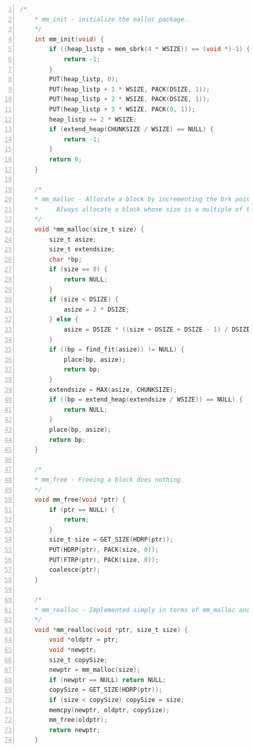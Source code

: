 \documentclass{article}
\begin{document}
\begin{lstlisting}[xleftmargin = 4em,xrightmargin = 3em, aboveskip = 1em, numbers = left, language = C]
    /* 
    * mm_init - initialize the malloc package.
    */
    int mm_init(void) {
        if ((heap_listp = mem_sbrk(4 * WSIZE)) == (void *)-1) {
            return -1;
        }
        PUT(heap_listp, 0);
        PUT(heap_listp + 1 * WSIZE, PACK(DSIZE, 1));
        PUT(heap_listp + 2 * WSIZE, PACK(DSIZE, 1));
        PUT(heap_listp + 3 * WSIZE, PACK(0, 1));
        heap_listp += 2 * WSIZE;
        if (extend_heap(CHUNKSIZE / WSIZE) == NULL) {
            return -1;
        }
        return 0;
    }

    /* 
    * mm_malloc - Allocate a block by incrementing the brk pointer.
    *     Always allocate a block whose size is a multiple of the alignment.
    */
    void *mm_malloc(size_t size) {
        size_t asize;
        size_t extendsize;
        char *bp;
        if (size == 0) {
            return NULL;
        }
        if (size < DSIZE) {
            asize = 2 * DSIZE;
        } else {
            asize = DSIZE * ((size + DSIZE + DSIZE - 1) / DSIZE);
        }
        if ((bp = find_fit(asize)) != NULL) {
            place(bp, asize);
            return bp;
        }
        extendsize = MAX(asize, CHUNKSIZE);
        if ((bp = extend_heap(extendsize / WSIZE)) == NULL) {
            return NULL;
        }
        place(bp, asize);
        return bp;
    }

    /*
    * mm_free - Freeing a block does nothing.
    */
    void mm_free(void *ptr) {
        if (ptr == NULL) {
            return;
        }
        size_t size = GET_SIZE(HDRP(ptr));
        PUT(HDRP(ptr), PACK(size, 0));
        PUT(FTRP(ptr), PACK(size, 0));
        coalesce(ptr);
    }

    /*
    * mm_realloc - Implemented simply in terms of mm_malloc and mm_free
    */
    void *mm_realloc(void *ptr, size_t size) {
        void *oldptr = ptr;
        void *newptr;
        size_t copySize;
        newptr = mm_malloc(size);
        if (newptr == NULL) return NULL;
        copySize = GET_SIZE(HDRP(ptr));
        if (size < copySize) copySize = size;
        memcpy(newptr, oldptr, copySize);
        mm_free(oldptr);
        return newptr;
    }

\end{lstlisting}
\end{document}
